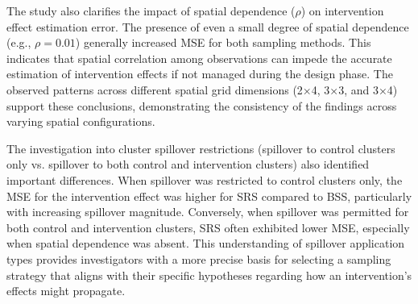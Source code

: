 \documentclass{article}[11pt]
\begin{document}
The study also clarifies the impact of spatial dependence ($\rho$) on intervention effect estimation error. The presence of even a small degree of spatial dependence (e.g., $\rho=0.01$) generally increased MSE for both sampling methods. This indicates that spatial correlation among observations can impede the accurate estimation of intervention effects if not managed during the design phase. The observed patterns across different spatial grid dimensions (2×4, 3×3, and 3×4) support these conclusions, demonstrating the consistency of the findings across varying spatial configurations. 

The investigation into cluster spillover restrictions (spillover to control clusters only vs. spillover to both control and intervention clusters) also identified important differences. When spillover was restricted to control clusters only, the MSE for the intervention effect was higher for SRS compared to BSS, particularly with increasing spillover magnitude. Conversely, when spillover was permitted for both control and intervention clusters, SRS often exhibited lower MSE, especially when spatial dependence was absent. This understanding of spillover application types provides investigators with a more precise basis for selecting a sampling strategy that aligns with their specific hypotheses regarding how an intervention's effects might propagate.
\end{document}
